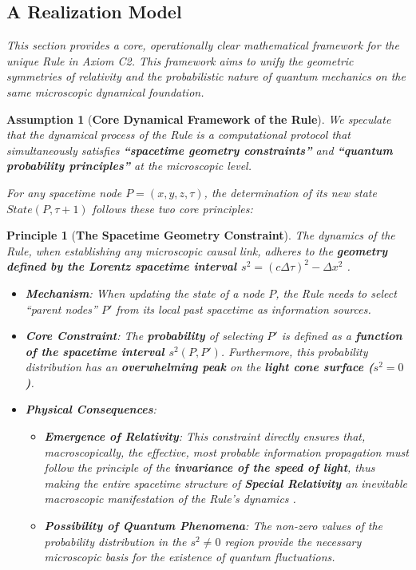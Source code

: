\documentclass[11pt, a4paper]{article}
\newtheorem{principle}{Principle}[section]  %
\newtheorem{assumption}{Assumption}[section] %
\begin{document}
\subsection*{A Realization Model}

\textit{This section provides a core, operationally clear mathematical framework for the unique Rule in Axiom C2. This framework aims to unify the geometric symmetries of relativity and the probabilistic nature of quantum mechanics on the same microscopic dynamical foundation.}

\begin{assumption}[\textbf{Core Dynamical Framework of the Rule}]
We speculate that the dynamical process of the Rule is a computational protocol that simultaneously satisfies \textbf{``spacetime geometry constraints''} and \textbf{``quantum probability principles''} at the microscopic level.

For any spacetime node $P = (x, y, z, \tau)$, the determination of its new state $State(P, \tau+1)$ follows these two core principles:
\end{assumption}

\begin{principle}[\textbf{The Spacetime Geometry Constraint}]
The dynamics of the Rule, when establishing any microscopic causal link, adheres to the \textbf{geometry defined by the Lorentz spacetime interval $s^2 = (c\Delta\tau)^2 - \Delta x^2$} \cite{Einstein1905}.
\begin{itemize}
    \item \textbf{Mechanism}: When updating the state of a node $P$, the Rule needs to select ``parent nodes'' $P'$ from its local past spacetime as information sources.
    \item \textbf{Core Constraint}: The \textbf{probability} of selecting $P'$ is defined as a \textbf{function of the spacetime interval $s^2(P, P')$}. Furthermore, this probability distribution has an \textbf{overwhelming peak} on the \textbf{light cone surface ($s^2 = 0$)}.
    \item \textbf{Physical Consequences}:
    \begin{itemize}
        \item \textbf{Emergence of Relativity}: This constraint directly ensures that, macroscopically, the effective, most probable information propagation must follow the principle of the \textbf{invariance of the speed of light}, thus making the entire spacetime structure of \textbf{Special Relativity} an inevitable macroscopic manifestation of the Rule's dynamics \cite{Einstein1905}.
        \item \textbf{Possibility of Quantum Phenomena}: The non-zero values of the probability distribution in the $s^2 \ne 0$ region provide the necessary microscopic basis for the existence of quantum fluctuations.
    \end{itemize}
\end{itemize}
\end{principle}
\end{document}
